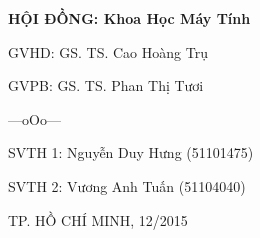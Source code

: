 \documentclass[12pt,a4paper,twoside]{report}
\begin{document}
\vspace{1.8cm}

\begin{minipage}{0.35\textwidth}
\phantom{ab1}
\end{minipage}
\begin{minipage}{0.65\textwidth}
\large\bfseries
HỘI ĐỒNG: Khoa Học Máy Tính\par
GVHD: GS. TS. Cao Hoàng Trụ\par
GVPB: GS. TS. Phan Thị Tươi\par
\centering---oOo---\par
\raggedright
SVTH 1: Nguyễn Duy Hưng (51101475)\par
SVTH 2: Vương Anh Tuấn (51104040)\par
\end{minipage}

\vspace{3.3cm}
\large TP. HỒ CHÍ MINH, 12/2015
\end{document}
